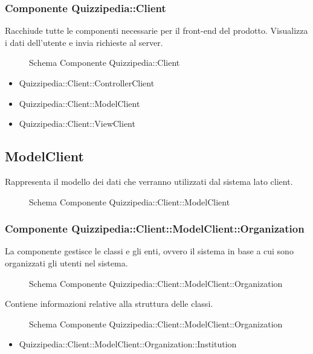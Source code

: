 \subsubsection{Componente Quizzipedia::Client}
Racchiude tutte le componenti necessarie per il front-end del prodotto. Visualizza i dati dell'utente e invia richieste al server.
\begin{figure}[H]
\centering
\noindent{}
\caption{Schema Componente Quizzipedia::Client}
\end{figure}
\begin{itemize}
\item Quizzipedia::Client::ControllerClient
\item Quizzipedia::Client::ModelClient
\item Quizzipedia::Client::ViewClient
\end{itemize}
\subsection{ModelClient}
Rappresenta il modello dei dati che verranno utilizzati dal sistema lato client.
\begin{figure}[H]
\centering
\noindent{}
\caption{Schema Componente Quizzipedia::Client::ModelClient}
\end{figure}
\subsubsection{Componente Quizzipedia::Client::ModelClient::Organization}
La componente gestisce le classi e gli enti, ovvero il sistema in base a cui sono organizzati gli utenti nel sistema.
\begin{figure}[H]
\centering
\noindent{}
\caption{Schema Componente Quizzipedia::Client::ModelClient::Organization}
\end{figure}
Contiene informazioni relative alla struttura delle classi.
\begin{figure}[H]
\centering
\noindent{}
\caption{Schema Componente Quizzipedia::Client::ModelClient::Organization}
\end{figure}
\begin{itemize}
\item Quizzipedia::Client::ModelClient::Organization::Institution
\end{itemize}
